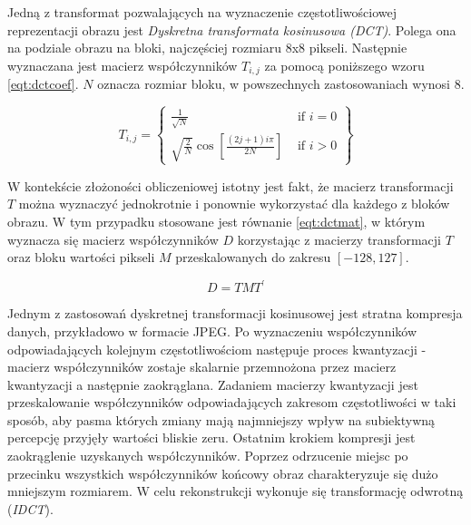 {{{            %
            Jedną z transformat pozwalających na wyznaczenie częstotliwościowej reprezentacji obrazu jest
            \textit{Dyskretna transformata kosinusowa (DCT)}\cite{ImageCompressionDCT}. Polega ona na podziale obrazu na
            bloki, najczęściej rozmiaru 8x8 pikseli. Następnie wyznaczana jest macierz współczynników $T_{i, j}$ za
            pomocą poniższego wzoru \ref{eqt:dctcoef}. $N$ oznacza rozmiar bloku, w powszechnych zastosowaniach wynosi
            8.

            \begin{equation}\label{eqt:dctcoef}
                T_{i, j}=\left\{\begin{array}{ll}\frac{1}{\sqrt{N}} & \text { if } i=0 \\ \sqrt{\frac{2}{N}} \cos \left[\frac{(2 j+1) i \pi}{2 N}\right] & \text { if } i>0\end{array}\right\}
            \end{equation}

            W kontekście złożoności obliczeniowej istotny jest fakt, że macierz transformacji $T$ można wyznaczyć
            jednokrotnie i ponownie wykorzystać dla każdego z bloków obrazu. W tym przypadku stosowane jest równanie
            \ref{eqt:dctmat}, w którym wyznacza się macierz współczynników $D$ korzystając z macierzy transformacji $T$
            oraz bloku wartości pikseli $M$ przeskalowanych do zakresu $[-128, 127]$.

            \begin{equation}\label{eqt:dctmat}
                D=T M T^{\prime}
            \end{equation}

            Jednym z zastosowań dyskretnej transformacji kosinusowej jest stratna kompresja danych, przykładowo w
            formacie JPEG. Po wyznaczeniu współczynników odpowiadających kolejnym częstotliwościom następuje proces
            kwantyzacji - macierz współczynników zostaje skalarnie przemnożona przez macierz kwantyzacji a następnie
            zaokrąglana. Zadaniem macierzy kwantyzacji jest przeskalowanie współczynników odpowiadających zakresom
            częstotliwości w taki sposób, aby pasma których zmiany mają najmniejszy wpływ na subiektywną percepcję
            przyjęły wartości bliskie zeru. Ostatnim krokiem kompresji jest zaokrąglenie uzyskanych współczynników.
            Poprzez odrzucenie miejsc po przecinku wszystkich współczynników końcowy obraz charakteryzuje się dużo
            mniejszym rozmiarem. W celu rekonstrukcji wykonuje się transformację odwrotną (\textit{IDCT}).

}}}
